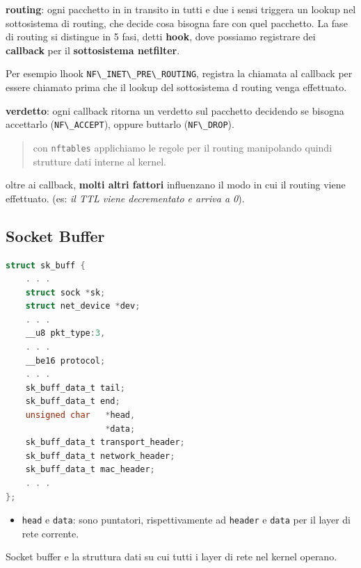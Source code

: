 \textbf{routing}: ogni pacchetto in in transito in tutti e due i sensi
triggera un lookup nel sottosistema di routing, che decide cosa bisogna
fare con quel pacchetto. La fase di routing si distingue in 5 fasi,
detti \textbf{hook}, dove possiamo registrare dei \textbf{callback} per
il \textbf{sottosistema netfilter}.

Per esempio l\textquotesingle hook
\passthrough{\lstinline!NF\_INET\_PRE\_ROUTING!}, registra la chiamata
al callback per essere chiamato prima che il lookup del sottosistema d
routing venga effettuato.

\textbf{verdetto}: ogni callback ritorna un verdetto sul pacchetto
decidendo se bisogna accettarlo (\passthrough{\lstinline!NF\_ACCEPT!}),
oppure buttarlo (\passthrough{\lstinline!NF\_DROP!}).

\begin{quote}
con \passthrough{\lstinline!nftables!} applichiamo le regole per il
routing manipolando quindi strutture dati interne al kernel.
\end{quote}

oltre ai callback, \textbf{molti altri fattori} influenzano il modo in
cui il routing viene effettuato. (es: \emph{il TTL viene decrementato e
arriva a 0}).

\subsection{Socket Buffer}\label{socket-buffer}

\begin{lstlisting}[language=C]
struct sk_buff {
    . . .
    struct sock *sk;
    struct net_device *dev;
    . . .
    __u8 pkt_type:3,
    . . .
    __be16 protocol;
    . . .
    sk_buff_data_t tail;
    sk_buff_data_t end;
    unsigned char   *head,
                    *data;
    sk_buff_data_t transport_header;
    sk_buff_data_t network_header;
    sk_buff_data_t mac_header;
    . . .
};
\end{lstlisting}

\begin{itemize}
\tightlist
\item
  \passthrough{\lstinline!head!} e \passthrough{\lstinline!data!}: sono
  puntatori, rispettivamente ad \passthrough{\lstinline!header!} e
  \passthrough{\lstinline!data!} per il layer di rete corrente.
\end{itemize}

Socket buffer e\textquotesingle{} la struttura dati su cui tutti i layer
di rete nel kernel operano.

